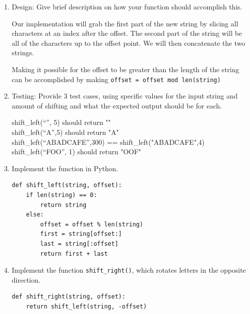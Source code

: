 \documentclass[11pt]{article}
\newenvironment{answer}{\large\lstset{basicstyle=\tiny}\color{white}}{}
\newenvironment{answer}{\large\lstset{basicstyle=\large}\color{red}}{}
\begin{document}
\begin{enumerate}
    \begin{enumerate}
        \item Design: Give brief description on how your function should
            accomplish this.

            \begin{answer}
            Our implementation will grab the first part of the new string by
            slicing all characters at an index after the offset. The second
            part of the string will be all of the characters up to the offset
            point. We will then concatenate the two strings.

            Making it possible for the offset to be greater than the length of
            the string can be accomplished by making {\tt offset = offset mod
            len(string)}
            \end{answer}

        \item Testing: Provide 3 test cases, using specific values for the input
            string and amount of shifting and what the expected output should be
            for each.

            \begin{answer}
                shift\_left(``'', 5) should return ""\\
                shift\_left(``A'',5) should return "A"\\
                shift\_left(``ABADCAFE'',300) == shift\_left("ABADCAFE",4)\\
                shift\_left(``FOO'', 1) should return "OOF"
            \end{answer}

        \item Implement the function in Python.

\begin{answer}
\begin{lstlisting}
def shift_left(string, offset):
    if len(string) == 0:
        return string
    else:
        offset = offset % len(string)
        first = string[offset:]
        last = string[:offset]
        return first + last
\end{lstlisting}
\end{answer}

        \item Implement the function {\tt shift\_right()}, which rotates letters
            in the opposite direction.

\begin{answer}
\begin{lstlisting}
def shift_right(string, offset):
    return shift_left(string, -offset)
\end{lstlisting}
\vspace{0.5in}
\end{answer}


\end{enumerate}
\end{enumerate}
\end{document}
